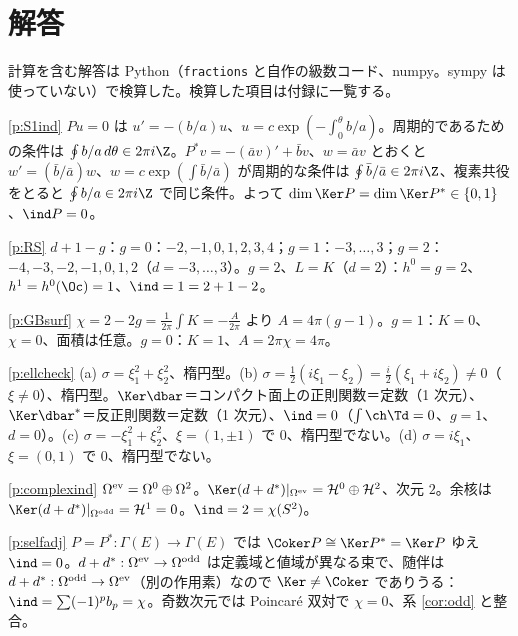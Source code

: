 
\section*{解答}
計算を含む解答は Python（\texttt{fractions} と自作の級数コード、numpy。sympy は使っていない）で検算した。検算した項目は付録に一覧する。
\begin{sol}{\ref{p:S1ind}}
$Pu=0$ は $u'=-(b/a)u$、$u=c\exp(-\int_0^\theta b/a)$。周期的であるための条件は $\oint b/a\,d\theta\in2\pi i\Z$。$P^*v=-(\bar av)'+\bar bv$、$w=\bar av$ とおくと $w'=(\bar b/\bar a)w$、$w=c\exp(\int\bar b/\bar a)$ が周期的な条件は $\oint\bar b/\bar a\in2\pi i\Z$、複素共役をとると $\oint b/a\in2\pi i\Z$ で同じ条件。よって $\dim\Ker P=\dim\Ker P^*\in\{0,1\}$、$\ind P=0$。
\end{sol}
\begin{sol}{\ref{p:RS}}
$d+1-g$：$g=0$：$-2,-1,0,1,2,3,4$；$g=1$：$-3,\dots,3$；$g=2$：$-4,-3,-2,-1,0,1,2$（$d=-3,\dots,3$）。$g=2$、$L=K$（$d=2$）：$h^0=g=2$、$h^1=h^0(\Oc)=1$、$\ind=1=2+1-2$。
\end{sol}
\begin{sol}{\ref{p:GBsurf}}
$\chi=2-2g=\frac1{2\pi}\int K=-\frac A{2\pi}$ より $A=4\pi(g-1)$。$g=1$：$K=0$、$\chi=0$、面積は任意。$g=0$：$K=1$、$A=2\pi\chi=4\pi$。
\end{sol}
\begin{sol}{\ref{p:ellcheck}}
(a) $\sigma=\xi_1^2+\xi_2^2$、楕円型。(b) $\sigma=\frac12(i\xi_1-\xi_2)=\frac i2(\xi_1+i\xi_2)\neq0$（$\xi\ne0$）、楕円型。$\Ker\dbar$＝コンパクト面上の正則関数＝定数（1 次元）、$\Ker\dbar^*$＝反正則関数＝定数（1 次元）、$\ind=0$（$\int\ch\Td=0$、$g=1$、$d=0$）。(c) $\sigma=-\xi_1^2+\xi_2^2$、$\xi=(1,\pm1)$ で $0$、楕円型でない。(d) $\sigma=i\xi_1$、$\xi=(0,1)$ で $0$、楕円型でない。
\end{sol}
\begin{sol}{\ref{p:complexind}}
$\Omega^{\rm ev}=\Omega^0\oplus\Omega^2$。$\Ker(d+d^*)|_{\Omega^{\rm ev}}=\mathcal H^0\oplus\mathcal H^2$、次元 $2$。余核は $\Ker(d+d^*)|_{\Omega^{\rm odd}}=\mathcal H^1=0$。$\ind=2=\chi(S^2)$。
\end{sol}
\begin{sol}{\ref{p:selfadj}}
$P=P^*:\Gamma(E)\to\Gamma(E)$ では $\Coker P\cong\Ker P^*=\Ker P$ ゆえ $\ind=0$。$d+d^*:\Omega^{\rm ev}\to\Omega^{\rm odd}$ は定義域と値域が異なる束で、随伴は $d+d^*:\Omega^{\rm odd}\to\Omega^{\rm ev}$（別の作用素）なので $\Ker\ne\Coker$ でありうる：$\ind=\sum(-1)^pb_p=\chi$。奇数次元では Poincaré 双対で $\chi=0$、系 \ref{cor:odd} と整合。
\end{sol}
